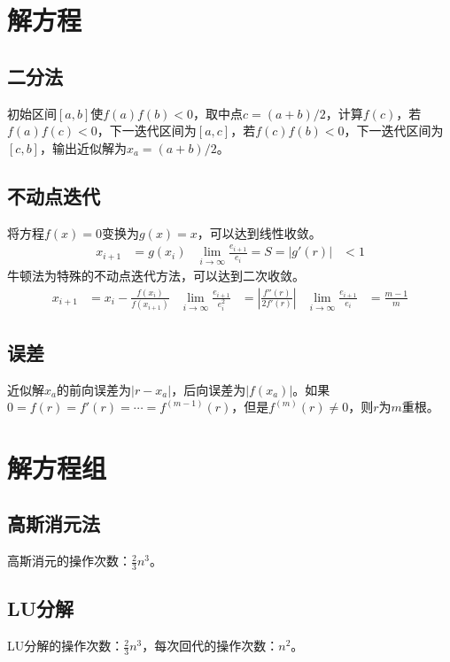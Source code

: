 \documentclass[twocolumn]{article}
\begin{document}
\section{解方程}

\subsection{二分法}
初始区间$[a,b]$使$f(a)f(b)<0$，取中点$c=(a+b)/2$，计算$f(c)$，若$f(a)f(c)<0$，下一迭代区间为$[a,c]$，若$f(c)f(b)<0$，下一迭代区间为$[c,b]$，输出近似解为$x_a=(a+b)/2$。

\subsection{不动点迭代}
将方程$f(x)=0$变换为$g(x)=x$，可以达到线性收敛。
\begin{align*}
    x_{i+1} & =g(x_i) & \lim_{i\rightarrow \infty}\frac{e_{i+1}}{e_i}=S=|g'(r)| & <1
\end{align*}
牛顿法为特殊的不动点迭代方法，可以达到二次收敛。
\begin{align*}
    x_{i+1} & =x_i-\frac{f(x_i)}{f(x_{i+1})} & \lim_{i\rightarrow \infty}\frac{e_{i+1}}{e_i^2} & =\left| \frac{f''(r)}{2f'(r)} \right| & \lim_{i\rightarrow \infty}\frac{e_{i+1}}{e_i} & =\frac{m-1}{m}
\end{align*}

\subsection{误差}
近似解$x_a$的前向误差为$|r-x_a|$，后向误差为$|f(x_a)|$。如果$0=f(r)=f'(r)=\cdots=f^{(m-1)}(r)$，但是$f^{(m)}(r)\neq 0$，则$r$为$m$重根。

\section{解方程组}

\subsection{高斯消元法}
高斯消元的操作次数：$\frac{2}{3}n^3$。

\subsection{LU分解}
LU分解的操作次数：$\frac{2}{3}n^3$，每次回代的操作次数：$n^2$。
\end{document}
